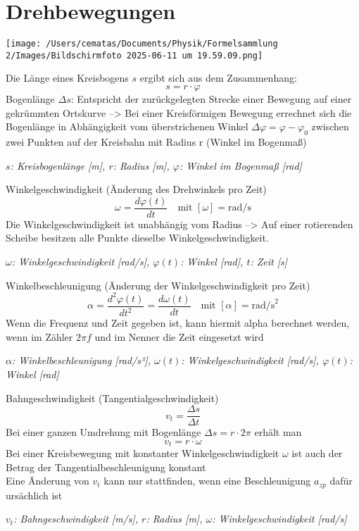 \documentclass[a4paper,10pt]{article}
\newenvironment{displayformula}
{
	\begin{framed}
		\color{formulaColor}
	}
	{\end{framed}}
\newcommand{\formulalegend}[1]{%
	\par\vspace{0.5ex}%
	{{\color{legendColor}\RaggedRight\small\textit{#1}}}%
	\par\vspace{1.5ex}%
}
\begin{document}
\section{Drehbewegungen}

\texttt{[image: /Users/cematas/Documents/Physik/Formelsammlung 2/Images/Bildschirmfoto 2025-06-11 um 19.59.09.png]}

\begin{displayformula}
	Die Länge eines Kreisbogens \( s \) ergibt sich aus dem Zusammenhang:
	\[
	s = r \cdot \varphi 
	\]
	Bogenlänge $\Delta s$: Entspricht der zurückgelegten Strecke einer Bewegung auf einer gekrümmten Ortskurve --> Bei einer Kreisförmigen Bewegung errechnet sich die Bogenlänge in Abhängigkeit vom überstrichenen Winkel $\Delta \varphi = \varphi - \varphi_0$ zwischen zwei Punkten auf der Kreisbahn mit Radius r (Winkel im Bogenmaß)
\end{displayformula}
\formulalegend{
	\( s \): Kreisbogenlänge [m], \( r \): Radius [m], \( \varphi \): Winkel im Bogenmaß [rad]
}

\begin{displayformula}
	Winkelgeschwindigkeit (Änderung des Drehwinkels pro Zeit)
	\[
	\omega = \frac{d\varphi(t)}{dt} \quad \text{mit } [\omega] = \text{rad/s}
	\]
	Die Winkelgeschwindigkeit ist unabhängig vom Radius --> Auf einer rotierenden Scheibe besitzen alle Punkte dieselbe Winkelgeschwindigkeit.
\end{displayformula}
\formulalegend{
	\( \omega \): Winkelgeschwindigkeit [rad/s], \( \varphi(t) \): Winkel [rad], \( t \): Zeit [s]
}

\begin{displayformula}
	Winkelbeschleunigung (Änderung der Winkelgeschwindigkeit pro Zeit)
	\[
	\alpha = \frac{d^2 \varphi(t)}{dt^2} = \frac{d\omega(t)}{dt} \quad \text{mit } [\alpha] = \text{rad/s}^2
	\]
	Wenn die Frequenz und Zeit gegeben ist, kann hiermit alpha berechnet werden, wenn im Zähler $2 \pi f$ und im Nenner die Zeit eingesetzt wird
\end{displayformula}
\formulalegend{
	\( \alpha \): Winkelbeschleunigung [rad/s²], \( \omega(t) \): Winkelgeschwindigkeit [rad/s], \( \varphi(t) \): Winkel [rad]
}

\begin{displayformula}
	Bahngeschwindigkeit (Tangentialgeschwindigkeit)
	\[
	v_t = \frac{\Delta s}{\Delta t}
	\]
	Bei einer ganzen Umdrehung mit Bogenlänge $\Delta s = r \cdot 2 \pi$ erhält man
	\[
	v_t = r \cdot \omega
	\]
	Bei einer Kreisbewegung mit konstanter Winkelgeschwindigkeit $\omega$ ist auch der Betrag der Tangentialbeschleunigung konstant \\
	Eine Änderung von $v_t$ kann nur stattfinden, wenn eine Beschleunigung $a_{zp}$ dafür ursächlich ist
\end{displayformula}
\formulalegend{
	\( v_t \): Bahngeschwindigkeit [m/s], \( r \): Radius [m], \( \omega \): Winkelgeschwindigkeit [rad/s]
}
\end{document}
